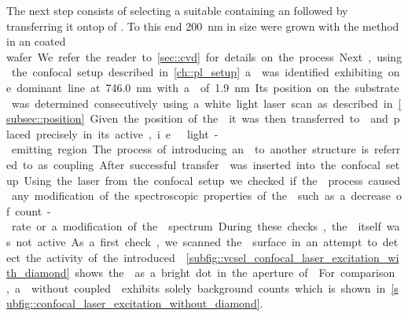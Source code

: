 	The next step consists of selecting a suitable \nd containing an \siv followed by transferring it ontop of \BmFour. To this end \nds \SI{200}{\nm} in size were grown with the \CVD method in an \ir coated \si wafer. We refer the reader to \autoref{sec::cvd} for details on the process.

	Next, using the confocal setup described in \autoref{ch::pl_setup} a \nd was identified exhibiting one dominant line at \SI{746.0}{nm} with a \lw of \SI{1.9}{nm}. Its position on the substrate was determined consecutively using a white light laser scan as described in \autoref{subsec::position}. Given the position of the \nd it was then transferred to \BmFour and placed precisely in its active, i.e.\ light-emitting region. The process of introducing an \siv to another structure is referred to as coupling.

	After successful transfer \BmFour was inserted into the confocal setup.
	Using the laser from the confocal setup we checked if the \pp process caused any modification of the spectroscopic properties of the \siv such as a decrease of count-rate or a modification of the \fl spectrum. During these checks, the \VCSEL itself was not active.

	As a first check, we scanned the \VCSEL surface in an attempt to detect the activity of the introduced \siv. \autoref{subfig::vcsel_confocal_laser_excitation_with_diamond} shows the \siv as a bright dot in the aperture of \BmFour. For comparison, a \Vcsel without coupled \siv exhibits solely background counts which is shown in \autoref{subfig::confocal_laser_excitation_without_diamond}.

